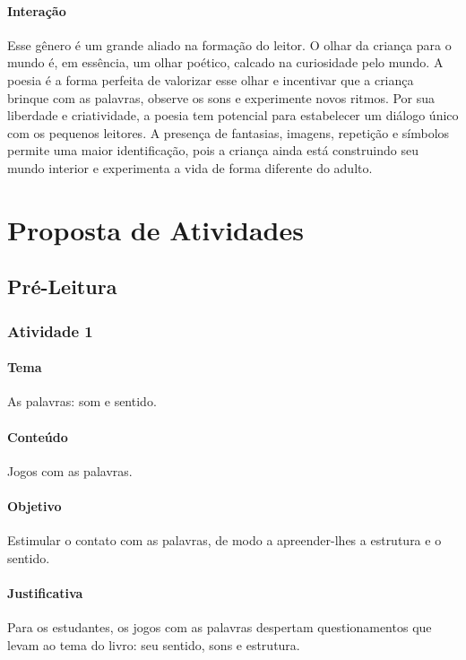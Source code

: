 \documentclass[11pt]{extarticle}
\begin{document}
\paragraph{Interação} Esse gênero é um grande aliado na formação do leitor. O olhar da criança para o mundo é, em essência, um olhar poético, calcado na curiosidade pelo mundo. A poesia é a forma perfeita de valorizar esse olhar e incentivar que a criança brinque com as palavras, observe os sons e experimente novos ritmos. Por sua liberdade e criatividade, a poesia tem potencial para estabelecer um diálogo único com os pequenos leitores. A presença de fantasias, imagens, repetição e símbolos permite uma maior identificação, pois a criança ainda está construindo seu mundo interior e experimenta a vida de forma diferente do adulto. 

\section{Proposta de Atividades}
\subsection{Pré-Leitura}
\subsubsection{Atividade 1}



\paragraph{Tema} As palavras: som e sentido. 

\paragraph{Conteúdo} Jogos com as palavras. 

\paragraph{Objetivo} Estimular o contato com as palavras, de modo a apreender-lhes a estrutura e o sentido. 

\paragraph{Justificativa} Para os estudantes, os jogos com as palavras despertam questionamentos que levam ao tema do livro: seu sentido, sons e estrutura.   
\end{document}
